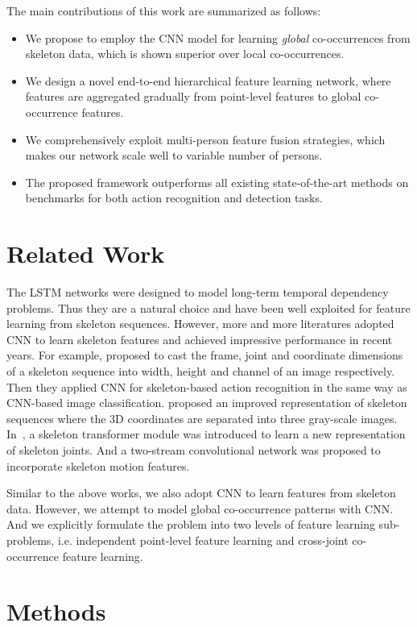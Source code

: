 \documentclass{article}
\begin{document}
The main contributions of this work are summarized as follows:
\begin{itemize}
  \item We propose to employ the CNN model for learning \emph{global} co-occurrences from skeleton data, which is shown superior over local co-occurrences.
  \item We design a novel end-to-end hierarchical feature learning network, where features are aggregated gradually from point-level features to global co-occurrence features.
  \item We comprehensively exploit multi-person feature fusion strategies, which makes our network scale well to variable number of persons.
  \item The proposed framework outperforms all existing state-of-the-art methods on benchmarks for both action recognition and detection tasks.
  \end{itemize}

\section{Related Work}

The LSTM networks were designed to model long-term temporal dependency problems. Thus they are a natural choice and have been well exploited for feature learning from skeleton sequences. However, more and more literatures adopted CNN to learn skeleton features and achieved impressive performance in recent years. For example, \cite{Du2016Skeleton} proposed to cast the frame, joint and coordinate dimensions of a skeleton sequence into width, height and channel of an image respectively. Then they applied CNN for skeleton-based action recognition in the same way as CNN-based image classification. \cite{Ke_2017_CVPR} proposed an improved representation of skeleton sequences where the 3D coordinates are separated into three gray-scale images. In~\cite{Li_2017_ICMEW}, a skeleton transformer module was introduced to learn a new representation of skeleton joints. And a two-stream convolutional network was proposed to incorporate skeleton motion features.

Similar to the above works, we also adopt CNN to learn features from skeleton data. However, we attempt to model global co-occurrence patterns with CNN. And we explicitly formulate the problem into two levels of feature learning sub-problems, i.e. independent point-level feature learning and cross-joint co-occurrence feature learning.


\section{Methods}
\end{document}
